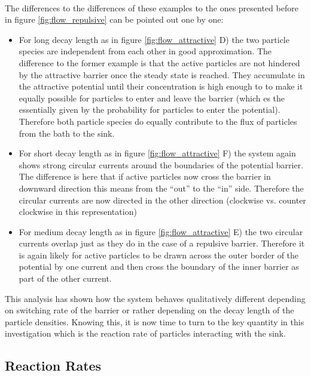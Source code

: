 \vspace{.5 cm} \\
The differences to the differences of these examples to the ones presented before in figure \ref{fig:flow_repulsive} can be pointed out one by one:
\begin{itemize}
    \item For long decay length as in figure \ref{fig:flow_attractive} D) the two particle species are independent from each other in good approximation. The difference to the former example is that the active particles are not hindered by the attractive barrier once the steady state is reached. They accumulate in the attractive potential until their concentration is high enough to to make it equally possible for particles to enter and leave the barrier (which es the essentially given by the probability for particles to enter the potential). Therefore both particle species do equally contribute to the flux of particles from the bath to the sink.
    \item For short decay length as in figure \ref{fig:flow_attractive} F) the system again shows strong circular currents around the boundaries of the potential barrier. The difference is here that if active particles now cross the barrier in downward direction this means from the ``out'' to the ``in'' side. Therefore the circular currents are now directed in the other direction (clockwise vs. counter clockwise in this representation)
    \item For medium decay length as in figure \ref{fig:flow_attractive} E)  the two circular currents overlap just as they do in the case of a repulsive barrier. Therefore it is again likely for active particles to be drawn across the outer border of the potential by one current and then cross the boundary of the inner barrier as part of the other current.
\end{itemize}
This analysis has shown how the system behaves qualitatively different depending on switching rate of the barrier or rather depending on the decay length of the particle densities. Knowing this, it is now time to turn to the key quantity in this investigation which is the reaction rate of particles interacting with the sink. 
\subsection{Reaction Rates}

